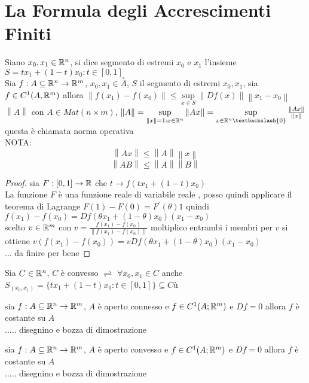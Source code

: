 \section{La Formula degli Accrescimenti Finiti}
Siano $x_0,x_1\in \mathbb{R}^n$, si dice segmento di estremi $x_0$ e $x_1$ l'insieme $S={tx_1+(1-t)x_0 : t\in[0,1]}$
\\
Sia $f:A\subseteq \mathbb{R}^n\rightarrow \mathbb{R}^m$, $x_0,x_1\in\overset{\circ}{A}$, $S$ il segmento di estremi $x_0,x_1$, sia $f\in C^1(A,\mathbb{R}^m)$ allora $\left\| f(x_1)-f(x_0) \right\|\le \sup\limits_{x\in S}\left\|Df(x)\right\|\left\|x_1-x_0\right\|$
\observation
$\left\| A \right\|$ con $A\in Mat(n\times m)$,  $\left\| A \right\|=\sup\limits_{\left\| x \right\|=1: x\in \R^n}\left\| Ax \right\| = \sup\limits_{x\in \R^n \textbackslash \{0\}}\frac{\left\| Ax \right\| }{\left\| x \right\| } $ questa è chiamata norma operativa\\
NOTA:\\
$$\left\| Ax \right\| \le \left\| A \right\| \left\| x \right\|  $$
$$\left\| AB \right\| \le \left\| A \right\| \left\| B \right\|  $$
\begin{proof}
	sia $F:[0,1]\rightarrow \mathbb{R}$ che $t\rightarrow f(tx_1+(1-t)x_0)$\\
	La funzione $F$ è una funzione reale di variabile reale , posso quindi applicare il teorema di Lagrange $F(1)-F(0)=F^{'}(\theta)1$ quindi $f(x_1)-f(x_0) = Df(\theta x_1 + (1-\theta)x_0)(x_1-x_0)$\\
	scelto $v\in \mathbb{R}^m$ con $v = \frac{f(x_1)-f(x_0)}{\left\| f(x_1)-f(x_0)\right\| }$ moltiplico entrambi i membri per $v$ si ottiene $v(f(x_1)-f(x_0)) = vDf(\theta x_1 + (1-\theta)x_0)(x_1-x_0)$\\
	... da finire per bene
\end{proof}
Sia $C\in \mathbb{R}^n$, $C$ è convesso $\rightleftharpoons$ $\forall x_0,x_1\in C$ anche $S_(x_0,x_1) = \{tx_1+(1-t)x_0 : t\in[0,1]\}\subseteq C$ù

\proposition
sia $f:A\subseteq \mathbb{R}^n \rightarrow \mathbb{R}^m$, $A$ è aperto connesso e $f\in C^1(A;\mathbb{R}^m)$ e $Df=0$ allora $f$ è costante su $A$\\
..... disegnino e bozza di dimostrazione

\proposition
sia $f:A\subseteq \mathbb{R}^n \rightarrow \mathbb{R}^m$, $A$ è aperto convesso e $f\in C^1(A;\mathbb{R}^m)$ e $Df=0$ allora $f$ è costante su $A$\\
..... disegnino e bozza di dimostrazione

